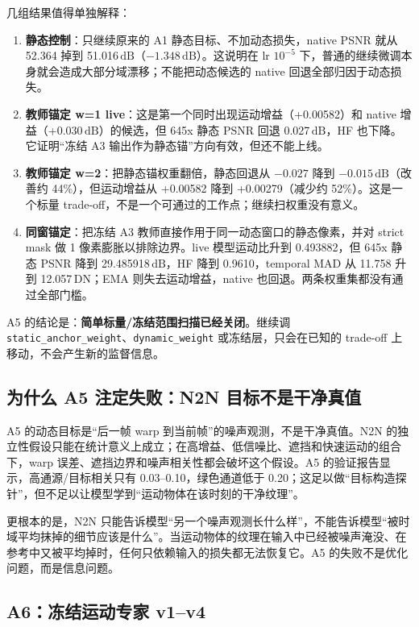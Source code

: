 \documentclass[11pt,a4paper,UTF8,fontset=fandol]{ctexart}
\newcommand{\dn}{\ensuremath{\,\mathrm{DN}}}
\newcommand{\db}{\ensuremath{\,\mathrm{dB}}}
\begin{document}
几组结果值得单独解释：

\begin{enumerate}
  \item \textbf{静态控制}：只继续原来的 A1 静态目标、不加动态损失，native PSNR 就从 52.364 掉到 51.016\db（$-1.348$\db）。这说明在 lr $10^{-5}$ 下，普通的继续微调本身就会造成大部分域漂移；不能把动态候选的 native 回退全部归因于动态损失。
  \item \textbf{教师锚定 w=1 live}：这是第一个同时出现运动增益（+0.00582）和 native 增益（+0.030\db）的候选，但 645x 静态 PSNR 回退 0.027\db，HF 也下降。它证明“冻结 A3 输出作为静态锚”方向有效，但还不能上线。
  \item \textbf{教师锚定 w=2}：把静态锚权重翻倍，静态回退从 $-0.027$ 降到 $-0.015$\db（改善约 44\%），但运动增益从 +0.00582 降到 +0.00279（减少约 52\%）。这是一个标量 trade-off，不是一个可通过的工作点；继续扫权重没有意义。
  \item \textbf{同窗锚定}：把冻结 A3 教师直接作用于同一动态窗口的静态像素，并对 strict mask 做 1 像素膨胀以排除边界。live 模型运动比升到 0.493882，但 645x 静态 PSNR 降到 29.485918\db，HF 降到 0.9610，temporal MAD 从 11.758 升到 12.057\dn；EMA 则失去运动增益，native 也回退。两条权重集都没有通过全部门槛。
\end{enumerate}

A5 的结论是：\textbf{简单标量/冻结范围扫描已经关闭}。继续调 \texttt{static\_anchor\_weight}、\texttt{dynamic\_weight} 或冻结层，只会在已知的 trade-off 上移动，不会产生新的监督信息。

\subsection{为什么 A5 注定失败：N2N 目标不是干净真值}

A5 的动态目标是“后一帧 warp 到当前帧”的噪声观测，不是干净真值。N2N 的独立性假设只能在统计意义上成立；在高增益、低信噪比、遮挡和快速运动的组合下，warp 误差、遮挡边界和噪声相关性都会破坏这个假设。A5 的验证报告显示，高通源/目标相关只有 0.03--0.10，绿色通道低于 0.20；这足以做“目标构造探针”，但不足以让模型学到“运动物体在该时刻的干净纹理”。

更根本的是，N2N 只能告诉模型“另一个噪声观测长什么样”，不能告诉模型“被时域平均抹掉的细节应该是什么”。当运动物体的纹理在输入中已经被噪声淹没、在参考中又被平均掉时，任何只依赖输入的损失都无法恢复它。A5 的失败不是优化问题，而是信息问题。

\subsection{A6：冻结运动专家 v1--v4}
\end{document}
